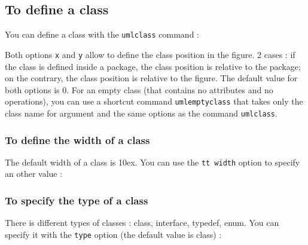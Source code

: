\documentclass[a4paper,11pt]{report}
\newcommand{\inputTikZ}[1]{%
  }%
\newcommand{\inputTikZ}[1]{%
    \texttt{[image: fig/\#1.pdf]}%
  }%
\begin{document}
\subsection{To define a class}\label{ss.class}

You can define a class with the {\tt umlclass} command :

\medskip

\begin{minipage}{0.5\textwidth}

\end{minipage}
\begin{minipage}{0.4\textwidth}
\begin{center}
\inputTikZ{class}
\end{center}
\end{minipage}

Both options {\tt x} and {\tt y} allow to define the class position in the figure. 2 cases : 
if the class is defined inside a package, the class position is relative to the package; 
on the contrary, the class position is relative to the figure. The default value for both options is 0. 
For an empty class (that contains no attributes and no operations), you can use a shortcut command 
{\tt umlemptyclass} that takes only the class name for argument and the same options as the command {\tt umlclass}.

\subsubsection{To define the width of a class}

The default width of a class is 10ex. You can use the {\tt tt width} option to specify an other value :

\medskip

\begin{minipage}{0.5\textwidth}

\end{minipage}
\begin{minipage}{0.4\textwidth}
\begin{center}
\inputTikZ{classwidth}
\end{center}
\end{minipage}

\subsubsection{To specify the type of a class}

There is different types of classes : class, interface, typedef, enum. You can specify it with the {\tt type} option (the default value is class) :
\end{document}
